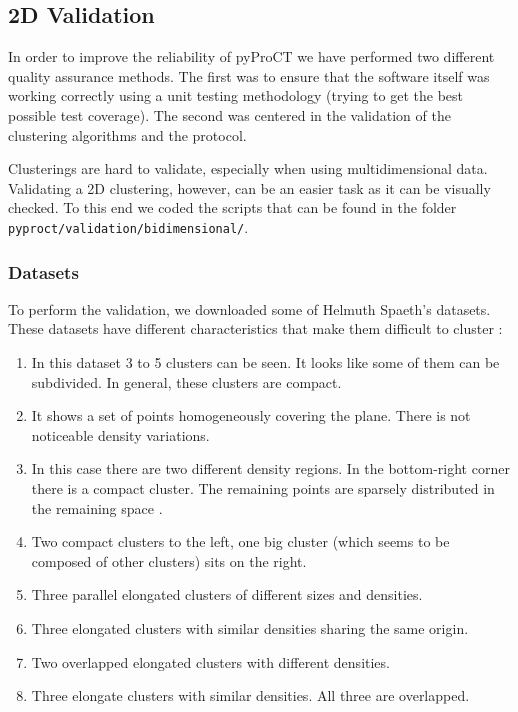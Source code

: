 \subsection{2D Validation}
\label{sec:pyproct_supp_6}

In order to improve the reliability of pyProCT we have performed two
different quality assurance methods. The first was to ensure that
the software itself was working correctly using a unit testing methodology
(trying to get the best possible test coverage). The second was centered
in the validation of the clustering algorithms and the protocol.

Clusterings are hard to validate, especially when using
multidimensional data. Validating a 2D clustering, however, can be
an easier task as it can be visually checked. To this end we coded
the scripts that can be found in the folder\texttt{ pyproct/validation/bidimensional/}.


\subsubsection{Datasets}

To perform the validation, we downloaded some of Helmuth Spaeth's\cite{spaeth_spaeth_????-1}
datasets. These datasets have different characteristics that make them
difficult to cluster : 
\begin{enumerate}
	\item In this dataset 3 to 5 clusters can be seen. It looks like some of
	them can be subdivided. In general, these clusters are compact.
	\item It shows a set of points homogeneously covering the plane. There is not noticeable
	density variations.
	\item In this case there are two different density regions. In the bottom-right
	corner there is a compact cluster. The remaining points are sparsely
	distributed in the remaining space .
	\item Two compact clusters to the left, one big cluster (which seems to
	be composed of other clusters) sits on the right.
	\item Three parallel elongated clusters of different sizes and densities.
	\item Three elongated clusters with similar densities sharing the same origin.
	\item Two overlapped elongated clusters with different densities.
	\item Three elongate clusters with similar densities. All three are overlapped.
\end{enumerate}

